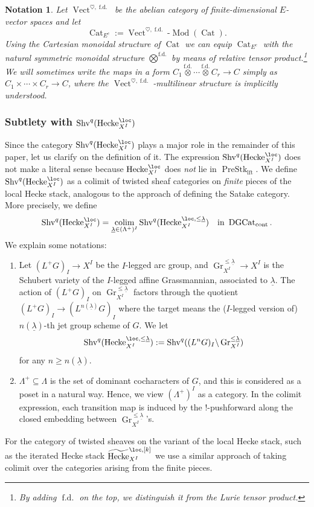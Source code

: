 \documentclass[10pt]{amsart}
\newcommand{\sssec}{\subsubsection}
\newtheorem{nota}[subsubsection]{Notation}
\theoremstyle{remark}
\newcommand{\te}{\text}
\newcommand{\ul}{\underline}
\newcommand{\wt}{\widetilde}
\newcommand{\on}{\operatorname}
\newcommand{\Cat}{\on{Cat}}
\newcommand{\CatEc}{\Cat_{E^c}}
\newcommand{\DGcat}{\on{DGCat}_{\on{cont}}}
\newcommand{\lMod}{\text{-}\on{Mod}}
\newcommand{\Vect}{\on{Vect}}
\newcommand{\Shv}{\on{Shv}}
\newcommand{\PreStklft}{\on{PreStk}_{\on{lft}}}
\DeclareMathOperator{\colim}{colim}
\newcommand{\Gr}{\on{Gr}}
\newcommand{\Hecke}{\on{Hecke}}
\newcommand{\Ectens}{\stackrel{\on{f.d.}}{\otimes}}
\newcommand{\Ectensbig}{\stackrel{\on{f.d.}}{\bigotimes}}
\newcommand{\VectAbfd}{\Vect^{\heartsuit,\on{f.d.}}}
\begin{document}
\begin{nota}\label{nota: introducing oneCatEc}
    Let $\VectAbfd$ be the abelian category of finite-dimensional $E$-vector spaces and let
\[\CatEc:=\Vect^{\heartsuit,\on{f.d.}}\lMod(\Cat).\]
Using the Cartesian monoidal structure of $\Cat$ we can equip $\CatEc$ with the natural symmetric monoidal structure $\Ectensbig$ by means of relative tensor product.\footnote{By adding $\on{f.d.}$ on the top, we distinguish it from the Lurie tensor product.} We will sometimes write the maps in a form
$C_1\Ectens \cdots\Ectens C_r\rightarrow C$
simply as $C_1\times\cdots\times C_r\rightarrow C$, where the $\Vect^{\heartsuit,\on{f.d.}}$-multilinear structure is implicitly understood.
\end{nota}

\sssec{Subtlety with $\Shv^q(\Hecke^{\loc}_{X^I})$}\label{sssec: subtlety Hecke}
Since the category $\Shv^q(\Hecke^{\loc}_{X^I})$ plays a major role in the remainder of this paper, let us clarify on the definition of it. The expression $\Shv^q(\Hecke^{\loc}_{X^I})$ does not make a literal sense because $\Hecke^{\loc}_{X^I}$ does \emph{not} lie in $\PreStklft$. We define $\Shv^q(\Hecke^{\loc}_{X^I})$ as a colimit of twisted sheaf categories on \emph{finite} pieces of the local Hecke stack, analogous to the approach of
\cite[Sect. 9.2]{Ach} defining the Satake category. More precisely, we define
\[\Shv^q(\Hecke^{\loc}_{X^I})=\colim_{\ul{\lambda}\in (\Lambda^+)^I} \Shv^q(\Hecke^{\loc,\le\ul{\lambda}}_{X^I})\quad\te{in }\DGcat.\]
We explain some notations:
\begin{enumerate}
    \item Let $(L^+G)_I\rightarrow X^I$ be the $I$-legged arc group, and $\Gr^{\le \ul{\lambda}}_{X^I}\rightarrow X^I$ is the Schubert variety of the $I$-legged affine Grassmannian, associated to $\ul{\lambda}$. 
    The action of $(L^+G)_I$ on $\Gr^{\le \ul{\lambda}}_{X^I}$ factors through the quotient $(L^+G)_I\rightarrow (L^{n(\ul{\lambda})}G)_I$
where the target means the ($I$-legged version of) $n(\ul{\lambda})$-th jet group scheme of $G$. We let
\[\Shv^q(\Hecke^{\loc,\le\ul{\lambda}}_{X^I}):= \Shv^q((L^{n} G)_I\backslash \Gr^{\le \ul{\lambda}}_{X^I})\]
for any $n\ge n(\ul{\lambda})$. 


    \item $\Lambda^+\subseteq \Lambda$ is the set of dominant cocharacters of $G$, and this is considered as a poset in a natural way. Hence, we view $(\Lambda^+)^I$ as a category. In the colimit expression, each transition map is induced by the $!$-pushforward along the closed embedding between $\Gr^{\le\ul{\lambda}}_{X^I}$'s.
\end{enumerate}
For the category of twisted sheaves on the variant of the local Hecke stack, such as the iterated Hecke stack $\wt{\Hecke}^{\loc,[k]}_{X^I}$ we use a similar approach of taking colimit over the categories arising from the finite pieces. 
\medskip
\end{document}

